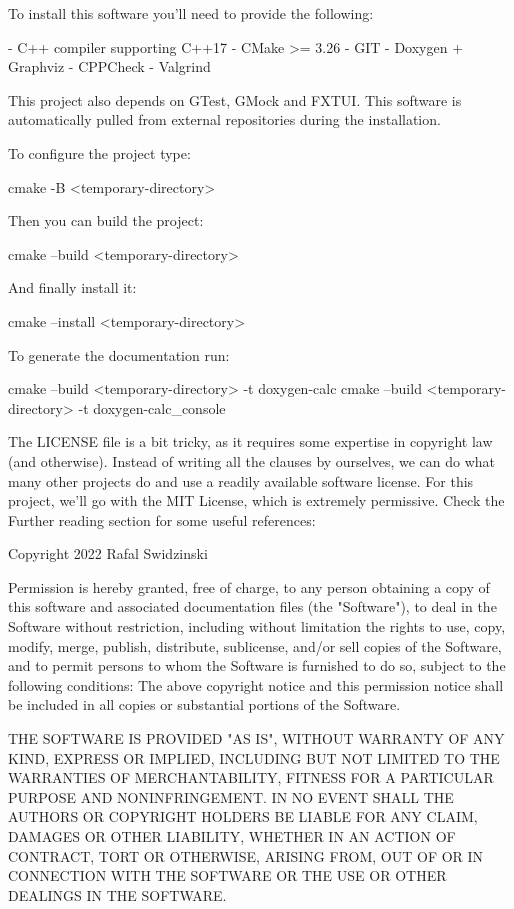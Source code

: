 \begin{shell}
To install this software you'll need to provide the following:

- C++ compiler supporting C++17
- CMake >= 3.26
- GIT
- Doxygen + Graphviz
- CPPCheck
- Valgrind

This project also depends on GTest, GMock and FXTUI. This
software is automatically pulled from external repositories
during the installation.

To configure the project type:

cmake -B <temporary-directory>

Then you can build the project:

cmake --build <temporary-directory>

And finally install it:

cmake --install <temporary-directory>

To generate the documentation run:

cmake --build <temporary-directory> -t doxygen-calc
cmake --build <temporary-directory> -t doxygen-calc_console
\end{shell}

The LICENSE file is a bit tricky, as it requires some expertise in copyright law (and otherwise). Instead of writing all the clauses by ourselves, we can do what many other projects do and use a readily available software license. For this project, we’ll go with the MIT License, which is extremely permissive. Check the Further reading section for some useful references:


\begin{shell}
Copyright 2022 Rafal Swidzinski

Permission is hereby granted, free of charge, to any person obtaining a
copy of this software and associated documentation files (the "Software"),
to deal in the Software without restriction, including without limitation
the rights to use, copy, modify, merge, publish, distribute, sublicense,
and/or sell copies of the Software, and to permit persons to whom the
Software is furnished to do so, subject to the following conditions:
The above copyright notice and this permission notice shall be included in
all copies or substantial portions of the Software.

THE SOFTWARE IS PROVIDED "AS IS", WITHOUT WARRANTY OF ANY KIND, EXPRESS OR
IMPLIED, INCLUDING BUT NOT LIMITED TO THE WARRANTIES OF MERCHANTABILITY,
FITNESS FOR A PARTICULAR PURPOSE AND NONINFRINGEMENT. IN NO EVENT SHALL
THE AUTHORS OR COPYRIGHT HOLDERS BE LIABLE FOR ANY CLAIM, DAMAGES OR OTHER
LIABILITY, WHETHER IN AN ACTION OF CONTRACT, TORT OR OTHERWISE, ARISING
FROM, OUT OF OR IN CONNECTION WITH THE SOFTWARE OR THE USE OR OTHER
DEALINGS IN THE SOFTWARE.
\end{shell}

